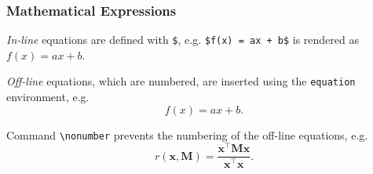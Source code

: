\documentclass[10pt,    %
    english,            %
    xcolor=table,       %
    envcountsect,       %
    aspectratio=43      %
]{beamer}
\begin{document}
\begin{frame}
    \frametitle{Mathematical Expressions} 
    
    \textit{In-line} equations are defined with \texttt{\$}, e.g. \texttt{\$f(x) = ax + b\$} is rendered as $f(x)=ax + b$.
    
    \medskip
    \textit{Off-line} equations, which are numbered, are inserted using the \texttt{equation} environment, e.g.
    \begin{equation}
        \label{equ:affine}
        f(x) = ax + b.
    \end{equation}
    
    Command \texttt{\textbackslash{}nonumber} prevents the numbering of the off-line equations, e.g.
    \begin{equation}
        \label{equ:rayleigh}
        r(\mathbf{x},\mathbf{M}) = \frac{\mathbf{x}^\top \mathbf{M} \mathbf{x}}{\mathbf{x}^\top \mathbf{x}}. \nonumber
    \end{equation}
    
    
    
    
    
    
\end{frame}




\end{document}
